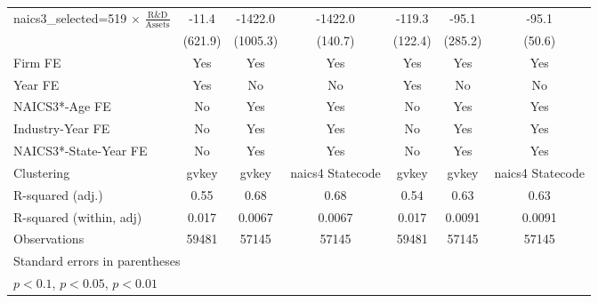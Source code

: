 {\begin{tabular}{l*{6}{c}}
\addlinespace
naics3\_selected=519 $\times$ $\frac{\textrm{R\&D}}{\textrm{Assets}}$&       -11.4         &     -1422.0         &     -1422.0\sym{***}&      -119.3         &       -95.1         &       -95.1\sym{*}  \\
                    &     (621.9)         &    (1005.3)         &     (140.7)         &     (122.4)         &     (285.2)         &      (50.6)         \\
\addlinespace
Firm FE             &         Yes         &         Yes         &         Yes         &         Yes         &         Yes         &         Yes         \\
\addlinespace
Year FE             &         Yes         &          No         &          No         &         Yes         &          No         &          No         \\
\addlinespace
NAICS3*-Age FE      &          No         &         Yes         &         Yes         &          No         &         Yes         &         Yes         \\
\addlinespace
Industry-Year FE    &          No         &         Yes         &         Yes         &          No         &         Yes         &         Yes         \\
\addlinespace
NAICS3*-State-Year FE&          No         &         Yes         &         Yes         &          No         &         Yes         &         Yes         \\
\midrule
Clustering          &       gvkey         &       gvkey         &naics4 Statecode         &       gvkey         &       gvkey         &naics4 Statecode         \\
R-squared (adj.)    &        0.55         &        0.68         &        0.68         &        0.54         &        0.63         &        0.63         \\
R-squared (within, adj)&       0.017         &      0.0067         &      0.0067         &       0.017         &      0.0091         &      0.0091         \\
Observations        &       59481         &       57145         &       57145         &       59481         &       57145         &       57145         \\
\bottomrule
\multicolumn{7}{l}{\footnotesize Standard errors in parentheses}\\
\multicolumn{7}{l}{\footnotesize \sym{*} \(p<0.1\), \sym{**} \(p<0.05\), \sym{***} \(p<0.01\)}\\
\end{tabular}
}

